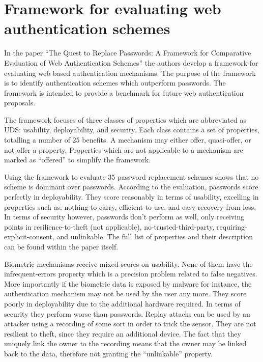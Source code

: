 \section{Framework for evaluating web authentication schemes}

In the paper ``The Quest to Replace Passwords: A Framework for Comparative Evaluation of Web Authentication Schemes'' \cite{} the authors develop a framework for evaluating web based authentication mechanisms. The purpose of the framework is to identify authentication schemes which outperform passwords. The framework is intended to provide a benchmark for future web authentication proposals.

The framework focuses of three classes of properties which are abbreviated as UDS: usability, deployability, and security. Each class contains a set of properties, totalling a number of 25 benefits. A mechanism may either offer, quasi-offer, or not offer a property. Properties which are not applicable to a mechanism are marked as ``offered'' to simplify the framework.

Using the framework to evaluate 35 password replacement schemes shows that no scheme is dominant over passwords. According to the evaluation, passwords score perfectly in deployability. They score reasonably in terms of usability, excelling in properties such as: nothing-to-carry, efficient-to-use, and easy-recovery-from-loss. In terms of security however, passwords don't perform as well, only receiving points in resilience-to-theft (not applicable), no-trusted-third-party, requiring-explicit-consent, and unlinkable. The full list of properties and their description can be found within the paper itself.

Biometric mechanisms receive mixed scores on usability. None of them have the infrequent-errors property which is a precision problem related to false negatives. More importantly if the biometric data is exposed by malware for instance, the authentication mechanism may not be used by the user any more. They score poorly in deployability due to the additional hardware required. In terms of security they perform worse than passwords. Replay attacks can be used by an attacker using a recording of some sort in order to trick the sensor. They are not resilient to theft, since they require an additional device. The fact that they uniquely link the owner to the recording means that the owner may be linked back to the data, therefore not granting the ``unlinkable'' property. 

